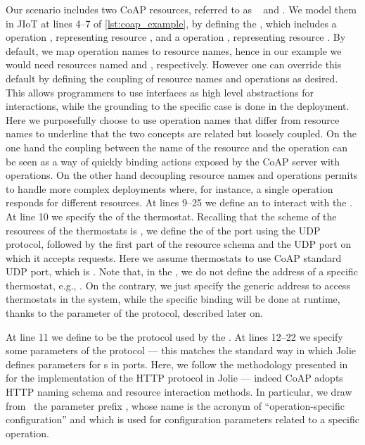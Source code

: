 Our scenario includes two CoAP resources, referred to as
~ and .
We model them in JIoT at lines 4--7
of \cref{lst:coap_example}, by defining the 
, which includes a
 operation , representing resource
, and a  operation
, representing resource .
%
By default, we map operation names to resource names, hence in our example we
would need resources named  and
, respectively. However one
can override
this default by defining the coupling of resource names and operations
as desired. This allows programmers to use interfaces as high level
abstractions for interactions,
while the grounding to the specific case is done in the deployment.
%
Here we purposefully choose to use operation names that differ from resource
names to underline that the two concepts are related but loosely coupled.
%
On the one hand the coupling between the name of the resource and the operation can be seen
as a way of quickly binding actions exposed by the CoAP server with operations.
On the other hand decoupling resource names and operations permits to handle
more complex deployments where, for instance, a single operation responds for
different resources.
%
At lines 9--25 we define an  to interact with the
.
%
At line 10 we specify the  of the thermostat. Recalling that
the scheme of the resources of the thermostats is
, we define the  of
the port using the UDP  protocol, followed by the
first part of the resource schema  and the UDP port on
which it accepts requests. Here we assume thermostats to use CoAP standard UDP
port, which is . Note that, in the , we do
not define the address of a specific thermostat, e.g.,
. On the contrary, we just specify
the generic address to access thermostats in the system, while the specific
binding will be done at runtime, thanks to the  parameter of
the  protocol, described later on.

At line 11 we define  to be the protocol used by the
. At lines 12--22 we specify some parameters of the
 protocol --- this matches the standard way in which Jolie defines
parameters for s in ports.
Here, we follow the methodology presented in~\cite{montesi16} for the
implementation of the HTTP protocol in Jolie --- indeed CoAP adopts HTTP naming
schema and resource interaction methods. In particular, we draw
from~\cite{montesi16} the parameter prefix , whose name is the
acronym of ``operation-specific configuration'' and which is used for
configuration parameters related to a specific operation.

